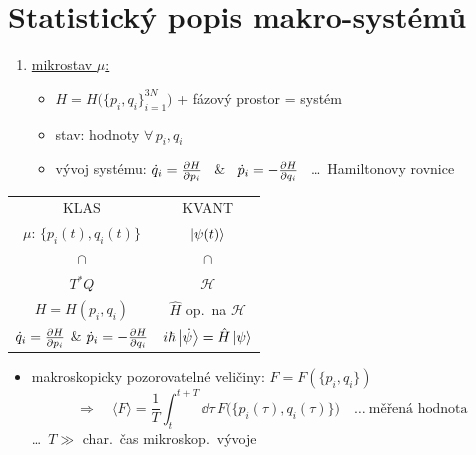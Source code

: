\section{Statistický popis makro-systémů}

\begin{minipage}[t]{0.6\textwidth}
\begin{enumerate}[label=\arabic*)]
  \item \underline{mikrostav $\mu$:}
  \begin{itemize}
    \item[$\to$] $H = H\big(\{p_i,q_i\}_{i=1}^{3N}\big)$ + fázový prostor = systém
    \item[$\to$] stav: hodnoty $\forall\, p_i, q_i$
    \item[$\to$] vývoj systému: \quad $\dot q_i = \pdv{H}{p_i}$ \ \& \ $\dot p_i = -\pdv{H}{q_i}$
          \ \dots\ Hamiltonovy rovnice
  \end{itemize}
\end{enumerate}
\end{minipage}
\begin{minipage}[t]{0.38\textwidth}
\color{NavyBlue}\small
\begin{tabular}{c|c}
KLAS & KVANT \\
$\mu$: $\{p_i(t),q_i(t)\}$ & $\ket{\psi(t)}$ \\
$\cap$ & $\cap$ \\
$T^*Q$ & $\mathcal{H}$ \\
$H = H(p_i,q_i)$ & $\hat H$ op.\ na $\mathcal{H}$ \\
$\dot q_i = \pdv{H}{p_i}$ \& $\dot p_i = -\pdv{H}{q_i}$ & $i\hbar\ket{\dot\psi} = \hat H\ket{\psi}$ \\ \hline
\end{tabular}
\end{minipage}

\begin{itemize}
  \item[$\to$] makroskopicky pozorovatelné veličiny: \quad $F = F(\{p_i,q_i\})$
  \[
    \Rightarrow\quad \langle F\rangle = \frac1T\int_t^{t+T}\dd\tau\,F\big(\{p_i(\tau),q_i(\tau)\}\big)
    \quad\dots\ \text{měřená hodnota}
  \]
  \hfill \dots\ $T\gg$ char.\ čas mikroskop.\ vývoje
\end{itemize}

